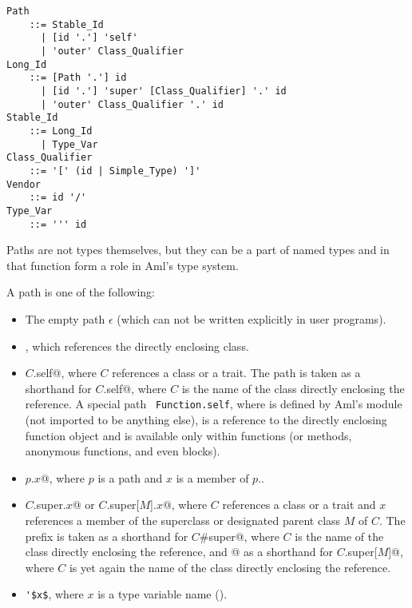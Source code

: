 \grammar\begin{lstlisting}
Path 
    ::= Stable_Id
      | [id '.'] 'self'
      | 'outer' Class_Qualifier
Long_Id 
    ::= [Path '.'] id
      | [id '.'] 'super' [Class_Qualifier] '.' id
      | 'outer' Class_Qualifier '.' id
Stable_Id
    ::= Long_Id
      | Type_Var
Class_Qualifier 
    ::= '[' (id | Simple_Type) ']'
Vendor
    ::= id '/'
Type_Var 
    ::= ''' id
\end{lstlisting}

Paths are not types themselves, but they can be a part of named types and in that function form a role in Aml's type system. 

A path is one of the following:

\begin{itemize}
  \item The empty path $\epsilon$ (which can not be written explicitly in user programs). 

  \item {}, which references the directly enclosing class. 

  \item \lstinline@$C$.self@, where $C$ references a class or a trait. The path  is taken as a shorthand for \lstinline@$C$.self@, where $C$ is the name of the class directly enclosing the reference. A special path ~\lstinline!Function.self!, where  is defined by Aml's  module (not imported to be anything else), is a reference to the directly enclosing function object and is available only within functions (or methods, anonymous functions, and even blocks).

  \item \lstinline@$p$.$x$@, where $p$ is a path and $x$ is a member of $p$.. 

  \item \lstinline@$C$.super.$x$@ or \lstinline@$C$.super[$M$].$x$@, where $C$ references a class or a trait and $x$ references a member of the superclass or designated parent class $M$ of $C$. The prefix  is taken as a shorthand for \lstinline@$C$#super@, where $C$ is the name of the class directly enclosing the reference, and \lstinline@super[$M$]@ as a shorthand for \lstinline@$C$.super[$M$]@, where $C$ is yet again the name of the class directly enclosing the reference. 

  \item \lstinline!'$x$!, where $x$ is a type variable name ().
\end{itemize}

